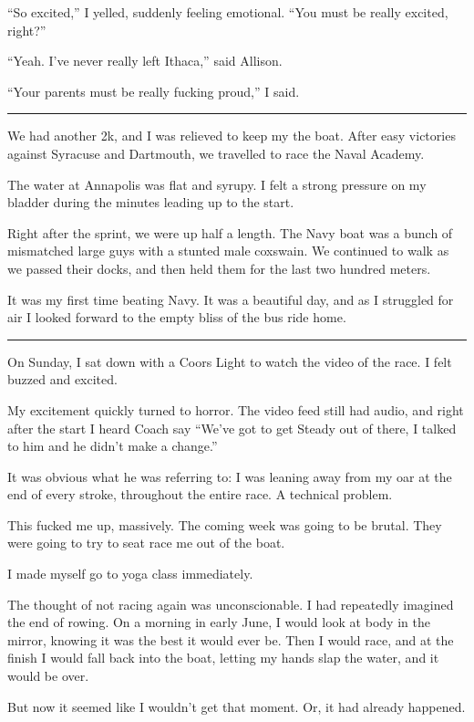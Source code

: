 ``So excited,'' I yelled, suddenly feeling emotional.  ``You must be
really excited, right?''

``Yeah.  I've never really left Ithaca,'' said Allison.

``Your parents must be really fucking proud,'' I said.

\plainfancybreak{12pt}{2}{}

We had another 2k, and I was relieved to keep my the boat.  After easy victories
against Syracuse and Dartmouth, we travelled to race the Naval Academy.  

The water at Annapolis was flat and syrupy.  I felt a strong pressure on my
bladder during the minutes leading up to the start.  

Right after the sprint, we were up half a length.  The Navy boat was a bunch of
mismatched large guys with a stunted male coxswain.  We continued to walk as we
passed their docks, and then held them for the last two hundred meters.

It was my first time beating Navy.  It was a beautiful day, and as I struggled
for air I looked forward to the empty bliss of the bus ride home.

\plainfancybreak{12pt}{2}{}

On Sunday, I sat down with a Coors Light to watch the video of the race.  I felt
buzzed and excited. 

My excitement quickly turned to horror.  The video feed still had audio, and
right after the start I heard Coach say ``We've got to get Steady out of there,
I talked to him and he didn't make a change.''  

It was obvious what he was referring to: I was leaning away from my oar at the
end of every stroke, throughout the entire race.  A technical problem.

This fucked me up, massively.  The coming week was going to be brutal.  They
were going to try to seat race me out of the boat.

I made myself go to yoga class immediately.  

The thought of not racing again was unconscionable.  I had repeatedly imagined
the end of rowing.  On a morning in early June, I would look at body in the
mirror, knowing it was the best it would ever be.  Then I would race, and at the
finish I would fall back into the boat, letting my hands slap the water, and it
would be over.

But now it seemed like I wouldn't get that moment.  Or, it had already happened.

